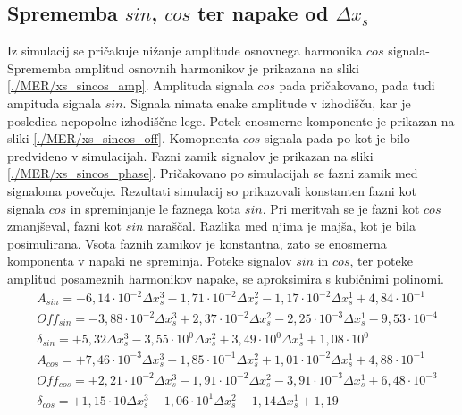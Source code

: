 \subsection{Sprememba $sin$, $cos$ ter napake od $\Delta x_s$}
Iz simulacij se pričakuje nižanje amplitude osnovnega harmonika $cos$ signala- Sprememba amplitud osnovnih harmonikov je prikazana na sliki \ref{./MER/xs_sincos_amp}. Amplituda signala $cos$ pada pričakovano, pada tudi ampituda signala $sin$. Signala nimata enake amplitude v izhodišču, kar je posledica nepopolne izhodiščne lege. Potek enosmerne komponente je prikazan na sliki \ref{./MER/xs_sincos_off}. Komopnenta $cos$ signala pada po kot je bilo predvideno v simulacijah. Fazni zamik signalov je prikazan na sliki \ref{./MER/xs_sincos_phase}. Pričakovano po simulacijah se fazni zamik med signaloma povečuje. Rezultati simulacij so prikazovali konstanten fazni kot signala $cos$ in spreminjanje le faznega kota $sin$. Pri meritvah se je fazni kot $cos$ zmanjševal, fazni kot $sin$ naraščal. Razlika med njima je majša, kot je bila posimulirana. Vsota faznih zamikov je konstantna, zato se enosmerna komponenta v napaki ne spreminja.
Poteke signalov $sin$ in $cos$, ter poteke amplitud posameznih harmonikov napake, se aproksimira s kubičnimi polinomi.
\begin{eqnarray}
&A_{sin} = -6,14\cdot 10^{-2}\Delta x_s^3-1,71\cdot 10^{-2}\Delta x_s^2-1,17\cdot 10^{-2}\Delta x_s^1+4,84\cdot 10^{-1}            \\  
&Off_{sin} = -3,88\cdot 10^{-2}\Delta x_s^3+2,37\cdot 10^{-2}\Delta x_s^2-2,25\cdot 10^{-3}\Delta x_s^1-9,53\cdot 10^{-4}            \\
&\delta_{sin} = +5,32            \Delta x_s^3-3,55\cdot 10^{0}\Delta x_s^2+3,49\cdot 10^{0}\Delta x_s^1+1,08\cdot 10^{0}            \\ 
&A_{cos} = +7,46\cdot 10^{-3}\Delta x_s^3-1,85\cdot 10^{-1}\Delta x_s^2+1,01\cdot 10^{-2}\Delta x_s^1+4,88\cdot 10^{-1}            \\  
&Off_{cos} = +2,21\cdot 10^{-2}\Delta x_s^3-1,91\cdot 10^{-2}\Delta x_s^2-3,91\cdot 10^{-3}\Delta x_s^1+6,48\cdot 10^{-3}            \\
&\delta_{cos} = +1,15\cdot 10    \Delta x_s^3-1,06\cdot 10^{1}\Delta x_s^2-1,14            \Delta x_s^1+1,19
\end{eqnarray}
